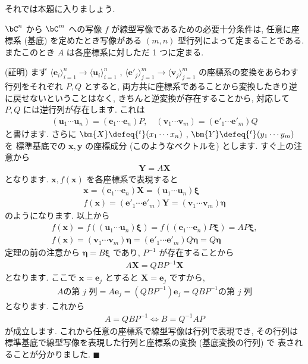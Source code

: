 \documentclass[openany, a4paper, oneside]{jsbook}
\begin{document}
それでは本題に入りましょう.
\begin{thm}
 $\bC^n$ から $\bC^m$ への写像 $f$ が線型写像であるための必要十分条件は,
 任意に座標系 (基底) を定めたとき写像がある $(m,n)$ 型行列によって定まることである.
 またこのとき $A$ は各座標系に対しただ 1 つに定まる.
\end{thm}
(証明)
まず $\langle \bm{e}_i \rangle _{i=1}^n \to \langle \bm{u}_i \rangle _{i=1}^n$ ,
 $\langle \bm{e}'_j \rangle _{j=1}^m \to \langle \bm{v}_j \rangle _{j=1}^m$ の座標系の変換をあらわす行列をそれぞれ $P,Q$ とすると,
両方共に座標系であることから変換したきり逆に戻せないということはなく, きちんと逆変換が存在することから,
対応して $P, Q$ には逆行列が存在します.
これは
\begin{gather}
    ( \bm{u}_1  \dotsb  \bm{u}_n )
    =
    ( \bm{e}_1  \dotsb  \bm{e}_n ) P
    , \quad
    ( \bm{v}_1  \dotsb  \bm{v}_m )
    =
    ( \bm{e}'_1  \dotsb  \bm{e}'_m ) Q
\end{gather}
と書けます.
さらに $\bm{X} \defeq {^t} ( x_1 \dotsb x_n )$ ,  $\bm{Y} \defeq {^t} ( y_1 \dotsb y_m)$ を
標準基底での $\bm{x},\bm{y}$ の座標成分
(このようなベクトルを) とします.
すぐ上の注意から
\begin{gather}
    \bm{Y}
    =
    A \bm{X}
\end{gather}
となります.
 $\bm{x} , f ( \bm{x} )$ を各座標系で表現すると
\begin{gather}
    \bm{x}
    =
    ( \bm{e}_1 \dotsb \bm{e}_n ) \bm{X}
    =
    ( \bm{u}_1 \dotsb \bm{u}_n ) \bm{\xi} \\
    f ( \bm{x} )
    =
    ( \bm{e}'_1 \dotsb \bm{e}'_m ) \bm{Y}
    =
    ( \bm{v}_1 \dotsb \bm{v}_m ) \bm{\eta}
\end{gather}
のようになります.
以上から
\begin{gather}
    f ( \bm{x} )
    =
    f \left ( ( \bm{u}_1 \dotsb \bm{u}_n ) \bm{\xi} \right)
    =
    f \left ( ( \bm{e}_1 \dotsb \bm{e}_n ) P \bm{\xi} \right)
    =
    A P \bm{\xi} , \\
    f ( \bm{x} )
    =
    ( \bm{v}_1 \dotsb \bm{v}_m ) \bm{\eta}
    =
    ( \bm{e}'_1  \dotsb  \bm{e}'_m ) Q \bm{\eta}
    =
    Q \bm{\eta}
\end{gather}
定理の前の注意から $\bm{\eta} = B \bm {\xi}$ であり,  $P^{-1}$ が存在することから
\begin{gather}
    A \bm{X}
    =
    Q B P^{-1} \bm{X}
\end{gather}
となります.
ここで $\bm{x} = \bm{e}_j$ とすると $\bm{X} = \bm{e}_j$ ですから,
\begin{gather}
    A\text{の第 $j$ 列}
    =
    A \bm{e}_j
    =
    ( Q B P^{-1} ) \bm{e}_j
    =
    Q B P^{-1} \text{の第 $j$ 列}
\end{gather}
となります.
これから
\begin{gather}
    A
    =
    Q B P^{-1}
    \Longleftrightarrow
    B
    =
    Q^{-1} A P
\label{eq:基底変換}
\end{gather}
が成立します.
これから任意の座標系で線型写像は行列で表現でき,
その行列は標準基底で線型写像を表現した行列と座標系の変換 (基底変換の行列) で
表されることが分かりました.  $\blacksquare$
\end{document}
